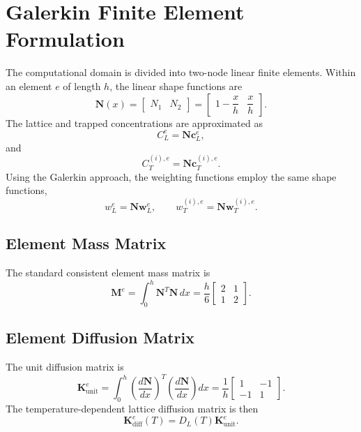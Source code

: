 \documentclass[a4paper,12pt,oneside]{report}
\begin{document}
\section{Galerkin Finite Element Formulation}
\label{sec:ch3_galerkin}

The computational domain is divided into two-node linear finite elements. Within an element $e$ of length $h$, the linear shape functions are
\begin{equation}
\mathbf{N}(x)
=
\begin{bmatrix}
N_1 & N_2
\end{bmatrix}
=
\begin{bmatrix}
1-\dfrac{x}{h} &
\dfrac{x}{h}
\end{bmatrix}.
\label{eq:ch3_shape}
\end{equation}
The lattice and trapped concentrations are approximated as
\begin{equation}
C_L^e
=
\mathbf{N}\mathbf{c}_L^e,
\end{equation}
and
\begin{equation}
C_T^{(i),e}
=
\mathbf{N}\mathbf{c}_T^{(i),e}.
\end{equation}
Using the Galerkin approach, the weighting functions employ the same shape functions,
\begin{equation}
w_L^e=\mathbf{N}\mathbf{w}_L^e,
\qquad
w_T^{(i),e}
=
\mathbf{N}\mathbf{w}_T^{(i),e}.
\end{equation}

\subsection{Element Mass Matrix}

The standard consistent element mass matrix is
\begin{equation}
\mathbf{M}^e
=
\int_0^h
\mathbf{N}^{T}\mathbf{N}\,dx
=
\frac{h}{6}
\begin{bmatrix}
2 & 1\\
1 & 2
\end{bmatrix}.
\label{eq:ch3_mass}
\end{equation}

\subsection{Element Diffusion Matrix}

The unit diffusion matrix is
\begin{equation}
\mathbf{K}_{\mathrm{unit}}^e
=
\int_0^h
\left(
\frac{d\mathbf{N}}{dx}
\right)^T
\left(
\frac{d\mathbf{N}}{dx}
\right)dx
=
\frac{1}{h}
\begin{bmatrix}
1 & -1\\
-1 & 1
\end{bmatrix}.
\label{eq:ch3_kunit}
\end{equation}
The temperature-dependent lattice diffusion matrix is then
\begin{equation}
\mathbf{K}_{\mathrm{diff}}^e(T)
=
D_L(T)
\mathbf{K}_{\mathrm{unit}}^e.
\label{eq:ch3_kdiff}
\end{equation}
\end{document}
